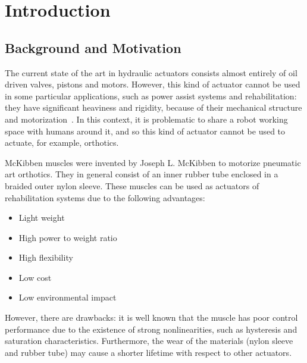 
\chapter{Introduction}
\label{ch:introduction} %


\section{Background and Motivation}

The current state of the art in hydraulic actuators consists almost entirely of
oil driven valves, pistons and motors. However, this kind of actuator cannot be 
used in some particular applications, such as power assist systems and rehabilitation:
they have significant heaviness and rigidity, because of their mechanical structure and
motorization~\cite{mckibben_tondu}. 
In this context, it is problematic to share a robot working space with humans around it, 
and so this kind of actuator cannot be used to actuate, for example, orthotics.

McKibben muscles were invented by Joseph L. McKibben to motorize pneumatic art orthotics.
They in general consist of an inner rubber tube enclosed in a braided outer nylon sleeve.
These muscles can be used as actuators of rehabilitation systems due to the following advantages:

\begin{itemize}[noitemsep]
	\item Light weight
	\item High power to weight ratio
	\item High flexibility
	\item Low cost
	\item Low environmental impact
\end{itemize}

However, there are drawbacks: it is well known that the muscle has poor control performance
due to the existence of strong nonlinearities, such as hysteresis and saturation characteristics.
Furthermore, the wear of the materials (nylon sleeve and rubber tube) may cause a shorter lifetime with respect to
other actuators.



